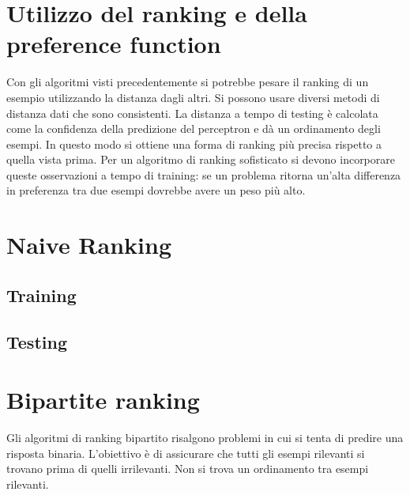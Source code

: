 \section{Utilizzo del ranking e della preference function}
Con gli algoritmi visti precedentemente si potrebbe pesare il ranking di un esempio utilizzando la distanza dagli altri.
Si possono usare diversi metodi di distanza dati che sono consistenti.
La distanza a tempo di testing \`e calcolata come la confidenza della predizione del perceptron e d\`a un ordinamento degli esempi.
In questo modo si ottiene una forma di ranking pi\`u precisa rispetto a quella vista prima.
Per un algoritmo di ranking sofisticato si devono incorporare queste osservazioni a tempo di training: se un problema ritorna un'alta differenza in preferenza tra due esempi dovrebbe avere un peso pi\`u alto.

\section{Naive Ranking}

	\subsection{Training}
	

	\subsection{Testing}
	

\section{Bipartite ranking}
Gli algoritmi di ranking bipartito risalgono problemi in cui si tenta di predire una risposta binaria.
L'obiettivo \`e di assicurare che tutti gli esempi rilevanti si trovano prima di quelli irrilevanti.
Non si trova un ordinamento tra esempi rilevanti.


